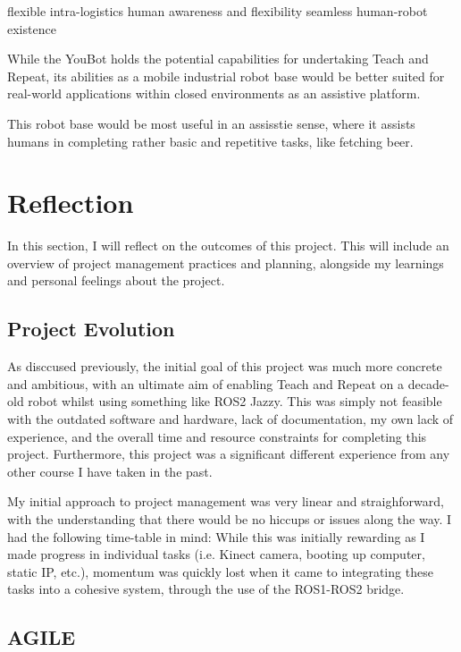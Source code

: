 \documentclass[a4paper, 12pt]{article}
\newif\ifshownotes
\newcommand{\notes}[1]{\ifshownotes\textcolor{blue}{#1}\fi}
\begin{document}
    flexible intra-logistics
    human awareness and flexibility 
    seamless human-robot existence

    While the YouBot holds the potential capabilities for undertaking Teach and Repeat, its abilities as a mobile industrial robot base would be better suited for real-world applications within closed environments as an assistive platform. 

    This robot base would be most useful in an assisstie  sense, where it assists humans in completing rather basic and repetitive tasks, like fetching beer. 

    \pagebreak

    \section{Reflection}

    \notes{draft 1, 11.05 6pm}

    In this section, I will reflect on the outcomes of this project. This will include an overview of project management practices and planning, alongside my learnings and personal feelings about the project. 

    \subsection{Project Evolution}

    As disccused previously, the initial goal of this project was much more concrete and ambitious, with an ultimate aim of enabling Teach and Repeat on a decade-old robot whilst using something like ROS2 Jazzy. This was simply not feasible with the outdated software and hardware, lack of documentation, my own lack of experience, and the overall time and resource constraints for completing this project. Furthermore, this project was a significant different experience from any other course I have taken in the past.
    
    My initial approach to project management was very linear and straighforward, with the understanding that there would be no hiccups or issues along the way. I had the following time-table in mind: \notes{maybe insert a table showcasing the plan here?} While this was initially rewarding as I made progress in individual tasks (i.e. Kinect camera, booting up computer, static IP, etc.), momentum was quickly lost when it came to integrating these tasks into a cohesive system, through the use of the ROS1-ROS2 bridge. 

    \subsection{AGILE}
\end{document}
